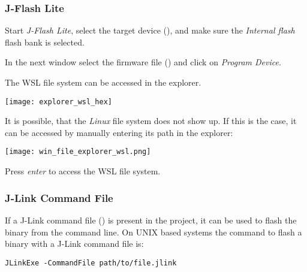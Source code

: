 \subsubsection{J-Flash Lite}\label{sec:jflash}
Start \emph{J-Flash Lite}, select the target device (\texttt{\mcu}), and make sure the \emph{Internal flash} flash bank is selected.

\begin{center}
\end{center}

In the next window select the firmware file () and click on \emph{Program Device}.

\begin{infobox}
  The WSL file system can be accessed in the explorer.
  \begin{center}
    \texttt{[image: explorer\_wsl\_hex]}
  \end{center}

  It is possible, that the \emph{Linux} file system does not show up.
  If this is the case, it can be accessed by manually entering its path in the explorer:
  \mono{\\\\wsl\$}
  \begin{center}
    \texttt{[image: win\_file\_explorer\_wsl.png]}
  \end{center}
  Press \emph{enter} to access the WSL file system.
\end{infobox}

\newpage

\subsubsection{J-Link Command File}
If a J-Link command file () is present in the project, it can be used to flash the binary from the command line.
On UNIX based systems the command to flash a binary with a J-Link command file is:

\begin{lstlisting}
JLinkExe -CommandFile path/to/file.jlink
\end{lstlisting}


